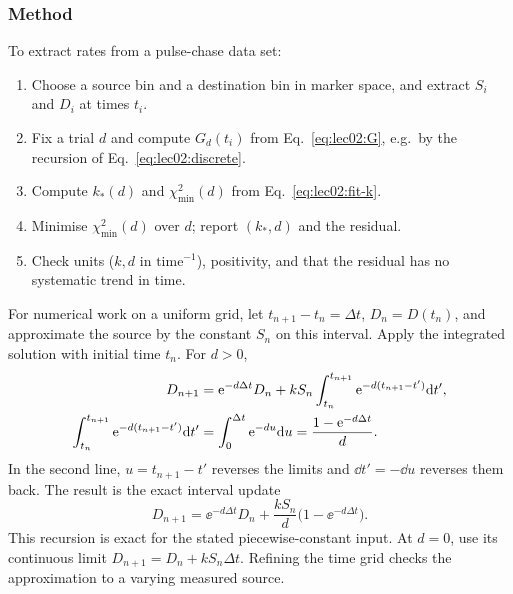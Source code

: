 \subsubsection*{Method}
To extract rates from a pulse-chase data set:
\begin{enumerate}
\item Choose a source bin and a destination bin in marker space, and extract $S_i$ and $D_i$ at times $t_i$.
\item Fix a trial $d$ and compute $G_d(t_i)$ from Eq.~\eqref{eq:lec02:G}, e.g.\ by the recursion of Eq.~\eqref{eq:lec02:discrete}.
\item Compute $k_*(d)$ and $\chi^2_{\min}(d)$ from Eq.~\eqref{eq:lec02:fit-k}.
\item Minimise $\chi^2_{\min}(d)$ over $d$; report $(k_*,d)$ and the residual.
\item Check units ($k,d$ in $\text{time}^{-1}$), positivity, and that the residual has no systematic trend in time.
\end{enumerate}

For numerical work on a uniform grid, let $t_{n+1}-t_n=\Delta t$, $D_n=D(t_n)$, and approximate the source by the constant $S_n$ on this interval. Apply the integrated solution with initial time $t_n$. For $d>0$,
\begin{align}
D_{n+1}&=\mathrm{e}^{-d\Delta t}D_n+kS_n\int_{t_n}^{t_{n+1}}\mathrm{e}^{-d(t_{n+1}-t')}\mathrm{d} t',\notag\\
\int_{t_n}^{t_{n+1}}\mathrm{e}^{-d(t_{n+1}-t')}\mathrm{d} t'
&=\int_0^{\Delta t}\mathrm{e}^{-du}\mathrm{d} u
=\frac{1-\mathrm{e}^{-d\Delta t}}{d}.\label{eq:lec02:discrete-integral}
\end{align}
In the second line, $u=t_{n+1}-t'$ reverses the limits and $\dd t'=-\dd u$ reverses them back. The result is the exact interval update
\begin{equation}\label{eq:lec02:discrete}
D_{n+1}=\ee^{-d\Delta t}D_n+\frac{kS_n}{d}\bigl(1-\ee^{-d\Delta t}\bigr).
\end{equation}
This recursion is exact for the stated piecewise-constant input. At $d=0$, use its continuous limit $D_{n+1}=D_n+kS_n\Delta t$. Refining the time grid checks the approximation to a varying measured source.

